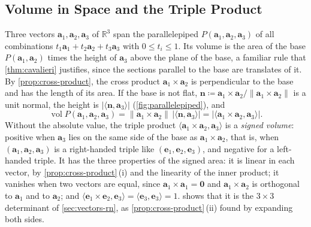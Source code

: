 \subsection{Volume in Space and the Triple Product}

Three vectors $\mathbf a_1,\mathbf a_2,\mathbf a_3$ of $\mathbb R^3$ span the parallelepiped $P(\mathbf a_1,\mathbf a_2,\mathbf a_3)$ of all combinations $t_1\mathbf a_1+t_2\mathbf a_2+t_3\mathbf a_3$ with $0\le t_i\le1$. Its volume is the area of the base $P(\mathbf a_1,\mathbf a_2)$ times the height of $\mathbf a_3$ above the plane of the base, a familiar rule that \cref{thm:cavalieri} justifies, since the sections parallel to the base are translates of it. By \cref{prop:cross-product}, the cross product $\mathbf a_1\times\mathbf a_2$ is perpendicular to the base and has the length of its area. If the base is not flat, $\mathbf n\coloneqq\mathbf a_1\times\mathbf a_2/\|\mathbf a_1\times\mathbf a_2\|$ is a unit normal, the height is $|\langle\mathbf n,\mathbf a_3\rangle|$ (\cref{fig:parallelepiped}), and
\[
\operatorname{vol}P(\mathbf a_1,\mathbf a_2,\mathbf a_3)=\|\mathbf a_1\times\mathbf a_2\|\,|\langle\mathbf n,\mathbf a_3\rangle|=\bigl|\langle\mathbf a_1\times\mathbf a_2,\mathbf a_3\rangle\bigr| .
\]
Without the absolute value, the triple product $\langle\mathbf a_1\times\mathbf a_2,\mathbf a_3\rangle$ is a \emph{signed volume}: positive when $\mathbf a_3$ lies on the same side of the base as $\mathbf a_1\times\mathbf a_2$, that is, when $(\mathbf a_1,\mathbf a_2,\mathbf a_3)$ is a right-handed triple like $(\mathbf e_1,\mathbf e_2,\mathbf e_3)$, and negative for a left-handed triple. It has the three properties of the signed area: it is linear in each vector, by \cref{prop:cross-product}\,(i) and the linearity of the inner product; it vanishes when two vectors are equal, since $\mathbf a_1\times\mathbf a_1=\mathbf 0$ and $\mathbf a_1\times\mathbf a_2$ is orthogonal to $\mathbf a_1$ and to $\mathbf a_2$; and $\langle\mathbf e_1\times\mathbf e_2,\mathbf e_3\rangle=\langle\mathbf e_3,\mathbf e_3\rangle=1$.  shows that it is the $3\times3$ determinant of \cref{sec:vectors-rn}, as \cref{prop:cross-product}\,(ii) found by expanding both sides.

